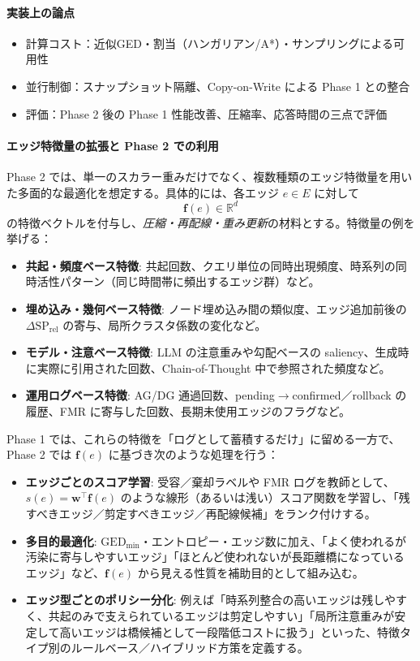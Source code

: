 \documentclass[ja=standard,xelatex]{bxjsarticle}
\begin{document}
\paragraph{実装上の論点}
\begin{itemize}[leftmargin=*]
  \item 計算コスト：近似GED・割当（ハンガリアン/A*）・サンプリングによる可用性
  \item 並行制御：スナップショット隔離、Copy-on-Write による Phase 1 との整合
  \item 評価：Phase 2 後の Phase 1 性能改善、圧縮率、応答時間の三点で評価
\end{itemize}

\paragraph{エッジ特徴量の拡張と Phase 2 での利用}
Phase 2 では、単一のスカラー重みだけでなく、複数種類のエッジ特徴量を用いた多面的な最適化を想定する。具体的には、各エッジ $e\in E$ に対して
\[
  \mathbf{f}(e)\in\mathbb{R}^d
\]
の特徴ベクトルを付与し、\emph{圧縮・再配線・重み更新}の材料とする。特徴量の例を挙げる：
\begin{itemize}[leftmargin=*]
  \item \textbf{共起・頻度ベース特徴}: 共起回数、クエリ単位の同時出現頻度、時系列の同時活性パターン（同じ時間帯に頻出するエッジ群）など。
  \item \textbf{埋め込み・幾何ベース特徴}: ノード埋め込み間の類似度、エッジ追加前後の $\Delta\mathrm{SP}_{\mathrm{rel}}$ の寄与、局所クラスタ係数の変化など。
  \item \textbf{モデル・注意ベース特徴}: LLM の注意重みや勾配ベースの saliency、生成時に実際に引用された回数、Chain-of-Thought 中で参照された頻度など。
  \item \textbf{運用ログベース特徴}: AG/DG 通過回数、pending$\to$confirmed／rollback の履歴、FMR に寄与した回数、長期未使用エッジのフラグなど。
\end{itemize}

Phase 1 では、これらの特徴を「ログとして蓄積するだけ」に留める一方で、Phase 2 では $\mathbf{f}(e)$ に基づき次のような処理を行う：
\begin{itemize}[leftmargin=*]
  \item \textbf{エッジごとのスコア学習}: 受容／棄却ラベルや FMR ログを教師として、$s(e)=\mathbf{w}^\top\mathbf{f}(e)$ のような線形（あるいは浅い）スコア関数を学習し、「残すべきエッジ／剪定すべきエッジ／再配線候補」をランク付けする。
  \item \textbf{多目的最適化}: $\mathrm{GED}_{\min}$・エントロピー・エッジ数に加え、「よく使われるが汚染に寄与しやすいエッジ」「ほとんど使われないが長距離橋になっているエッジ」など、$\mathbf{f}(e)$ から見える性質を補助目的として組み込む。
  \item \textbf{エッジ型ごとのポリシー分化}: 例えば「時系列整合の高いエッジは残しやすく、共起のみで支えられているエッジは剪定しやすい」「局所注意重みが安定して高いエッジは橋候補として一段階低コストに扱う」といった、特徴タイプ別のルールベース／ハイブリッド方策を定義する。
\end{itemize}
\end{document}
